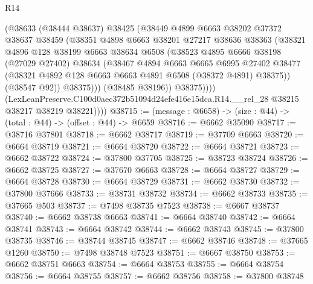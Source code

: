 \begin{lexlean}{R14}
\begin{coremodule}
                  (@38633
                    (@38444 @38637)
                    @38425
                    (@38449
                      @4899
                      @6663
                      @38202
                      @37372
                      @38637
                      @38459
                      (@38351
                        @4898
                        @6663
                        @38201
                        @27217
                        @38636
                        @38363
                        (@38321
                          @4896
                          @128
                          @38199
                          @6663
                          @38634
                          @6508
                          (@38523
                            @4895
                            @6666
                            @38198
                            (@27029 @27402)
                            @38634
                            (@38467
                              @4894
                              @6663
                              @6665
                              @6995
                              @27402
                              @38477
                              (@38321 @4892 @128 @6663 @6663 @4891 @6508 (@38372 @4891) @38375))
                            (@38547 @92))
                          @38375)))
                    (@38485 @38196))
                  @38375))))
          (LexLeanPreserve.C100d0aec372b51094d24efe416e15dca.R14.__rel_28
            @38215
            @38217
            @38219
            @38221))))
@38715 := (message : @6658) -> (size : @44) -> (total : @44) -> (offset : @44) -> @6659
@38716 := @6662 @35090
@38717 := @38716 @37801
@38718 := @6662 @38717
@38719 := @37709 @6663
@38720 := @6664 @38719
@38721 := @6664 @38720
@38722 := @6664 @38721
@38723 := @6662 @38722
@38724 := @37800 @37705
@38725 := @38723 @38724
@38726 := @6662 @38725
@38727 := @37670 @6663
@38728 := @6664 @38727
@38729 := @6664 @38728
@38730 := @6664 @38729
@38731 := @6662 @38730
@38732 := @37800 @37666
@38733 := @38731 @38732
@38734 := @6662 @38733
@38735 := @37665 @503
@38737 := @7498 @38735 @7523
@38738 := @6667 @38737
@38740 := @6662 @38738 @6663
@38741 := @6664 @38740
@38742 := @6664 @38741
@38743 := @6664 @38742
@38744 := @6662 @38743
@38745 := @37800 @38735
@38746 := @38744 @38745
@38747 := @6662 @38746
@38748 := @37665 @1260
@38750 := @7498 @38748 @7523
@38751 := @6667 @38750
@38753 := @6662 @38751 @6663
@38754 := @6664 @38753
@38755 := @6664 @38754
@38756 := @6664 @38755
@38757 := @6662 @38756
@38758 := @37800 @38748

\end{coremodule}
\end{lexlean}
